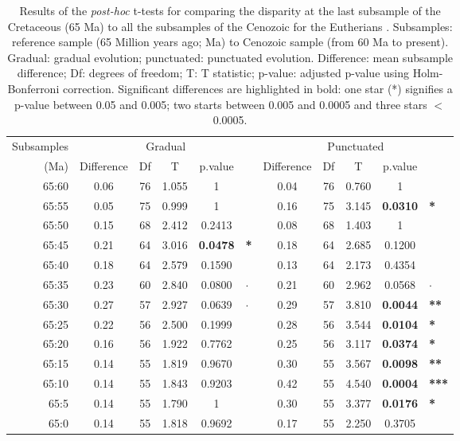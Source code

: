 \documentclass[12pt,letterpaper]{article}
\begin{document}
\begin{table}[!ht]
\caption{Results of the \textit{post-hoc} t-tests for comparing the disparity at the last subsample of the Cretaceous (65 Ma) to all the subsamples of the Cenozoic for the Eutherians \citep[data from][]{beckancient2014}. Subsamples: reference sample (65 Million years ago; Ma) to Cenozoic sample (from 60 Ma to present). Gradual: gradual evolution; punctuated: punctuated evolution. Difference: mean subsample difference; Df: degrees of freedom; T: T statistic; p-value: adjusted p-value using Holm-Bonferroni correction. Significant differences are highlighted in bold: one star (*) signifies a p-value between 0.05 and 0.005; two starts between 0.005 and 0.0005 and three stars $<$ 0.0005.}
\label{tab:Tab_beck_raw}
\centering
\begin{tabular}{r|ccccl|ccccl}
  \hline
  Subsamples & \multicolumn{5}{c|}{Gradual} & \multicolumn{5}{c}{Punctuated} \\
  (Ma) & Difference & Df & T & p.value & & Difference & Df & T & p.value &\\ 
  \hline
  65:60 & 0.06 & 76 & 1.055 & 1      & & 0.04 & 76 & 0.760 & 1      &\\ 
  65:55 & 0.05 & 75 & 0.999 & 1      & & 0.16 & 75 & 3.145 & \textbf{0.0310} & \textbf{*} \\ 
  65:50 & 0.15 & 68 & 2.412 & 0.2413 & & 0.08 & 68 & 1.403 & 1      &\\ 
  65:45 & 0.21 & 64 & 3.016 & \textbf{0.0478} & \textbf{*} & 0.18 & 64 & 2.685 & 0.1200 &\\ 
  65:40 & 0.18 & 64 & 2.579 & 0.1590 & & 0.13 & 64 & 2.173 & 0.4354 &\\ 
  65:35 & 0.23 & 60 & 2.840 & 0.0800 & $\cdotp$ & 0.21 & 60 & 2.962 & 0.0568 & $\cdotp$ \\ 
  65:30 & 0.27 & 57 & 2.927 & 0.0639 & $\cdotp$ & 0.29 & 57 & 3.810 & \textbf{0.0044} & \textbf{**} \\ 
  65:25 & 0.22 & 56 & 2.500 & 0.1999 & & 0.28 & 56 & 3.544 & \textbf{0.0104} & \textbf{*} \\ 
  65:20 & 0.16 & 56 & 1.922 & 0.7762 & & 0.25 & 56 & 3.117 & \textbf{0.0374} & \textbf{*}\\ 
  65:15 & 0.14 & 55 & 1.819 & 0.9670 & & 0.30 & 55 & 3.567 & \textbf{0.0098} & \textbf{**}\\ 
  65:10 & 0.14 & 55 & 1.843 & 0.9203 & & 0.42 & 55 & 4.540 & \textbf{0.0004} & \textbf{***} \\ 
  65:5  & 0.14 & 55 & 1.790 & 1      & & 0.30 & 55 & 3.377 & \textbf{0.0176} & \textbf{*} \\ 
  65:0  & 0.14 & 55 & 1.818 & 0.9692 & & 0.17 & 55 & 2.250 & 0.3705 \\ 
   \hline
\end{tabular}
\end{table}
\end{document}
